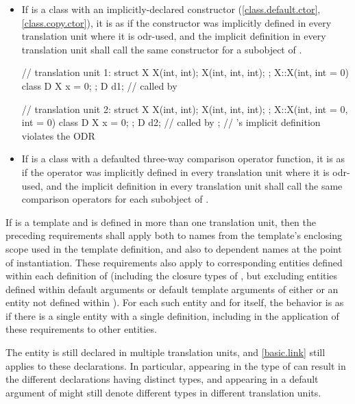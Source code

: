 \begin{itemize}
\item If  is a class with an implicitly-declared
constructor (\ref{class.default.ctor}, \ref{class.copy.ctor}),
it is as if the constructor was
implicitly defined in every translation unit where it is odr-used, and the
implicit definition in every translation unit shall call the same
constructor for a subobject of .
\begin{example}
\begin{codeblock}
// translation unit 1:
struct X {
  X(int, int);
  X(int, int, int);
};
X::X(int, int = 0) { }
class D {
  X x = 0;
};
D d1;                           //  called by 

// translation unit 2:
struct X {
  X(int, int);
  X(int, int, int);
};
X::X(int, int = 0, int = 0) { }
class D {
  X x = 0;
};
D d2;                           //  called by ;
                                // 's implicit definition violates the ODR
\end{codeblock}
\end{example}

\item If  is a class with
a defaulted three-way comparison operator function,
it is as if the operator was
implicitly defined in every translation unit where it is odr-used, and the
implicit definition in every translation unit shall call the same
comparison operators for each subobject of .
\end{itemize}

\pnum
If  is a template and is defined in more than one
translation unit, then the preceding requirements
shall apply both to names from the template's enclosing scope used in the
template definition, and also to dependent names at
the point of instantiation.
These requirements also apply to corresponding entities
defined within each definition of 
(including the closure types of ,
but excluding entities defined within default arguments or
default template arguments of either  or
an entity not defined within ).
For each such entity and for  itself,
the behavior is as if there is a single entity with a single definition,
including in the application of these requirements to other entities.
\begin{note}
The entity is still declared in multiple translation units, and \ref{basic.link}
still applies to these declarations. In particular,
appearing in the type of  can result
in the different declarations having distinct types, and
 appearing in a default argument of 
might still denote different types in different translation units.
\end{note}

